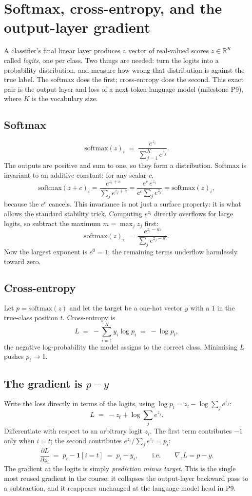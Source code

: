 \section{Softmax, cross-entropy, and the output-layer gradient}\label{sec:03}

A classifier's final linear layer produces a vector of real-valued scores
$z \in \mathbb{R}^{K}$ called \emph{logits}, one per class. Two things are
needed: turn the logits into a probability distribution, and measure how wrong
that distribution is against the true label. The softmax does the first;
cross-entropy does the second. This exact pair is the output layer and loss of a
next-token language model (milestone P9), where $K$ is the vocabulary size.

\subsection*{Softmax}
\[
  \mathrm{softmax}(z)_i \;=\; \frac{e^{z_i}}{\sum_{j=1}^{K} e^{z_j}}.
\]
The outputs are positive and sum to one, so they form a distribution. Softmax is
invariant to an additive constant: for any scalar $c$,
\[
  \mathrm{softmax}(z+c)_i
    = \frac{e^{z_i+c}}{\sum_j e^{z_j+c}}
    = \frac{e^{c}\,e^{z_i}}{e^{c}\sum_j e^{z_j}}
    = \mathrm{softmax}(z)_i,
\]
because the $e^{c}$ cancels. This invariance is not just a surface property: it is what
allows the standard stability trick. Computing $e^{z_i}$ directly overflows for large
logits, so subtract the maximum $m=\max_j z_j$ first:
\[
  \mathrm{softmax}(z)_i \;=\; \frac{e^{z_i - m}}{\sum_{j} e^{z_j - m}}.
\]
Now the largest exponent is $e^{0}=1$; the remaining terms underflow harmlessly
toward zero.

\subsection*{Cross-entropy}
Let $p=\mathrm{softmax}(z)$ and let the target be a one-hot vector $y$ with a $1$
in the true-class position $t$. Cross-entropy is
\[
  L \;=\; -\sum_{i=1}^{K} y_i \log p_i \;=\; -\log p_t,
\]
the negative log-probability the model assigns to the correct class. Minimising
$L$ pushes $p_t \to 1$.

\subsection*{The gradient is $p-y$}
Write the loss directly in terms of the logits, using
$\log p_t = z_t - \log\sum_j e^{z_j}$:
\[
  L \;=\; -z_t + \log\sum_{j} e^{z_j}.
\]
Differentiate with respect to an arbitrary logit $z_i$. The first term
contributes $-1$ only when $i=t$; the second contributes
$e^{z_i}/\sum_j e^{z_j}=p_i$:
\[
  \frac{\partial L}{\partial z_i}
    \;=\; p_i - \mathbf{1}[i=t]
    \;=\; p_i - y_i,
  \qquad\text{i.e.}\qquad
  \nabla_z L = p - y.
\]
The gradient at the logits is simply \emph{prediction minus target}. This is the
single most reused gradient in the course: it collapses the output-layer
backward pass to a subtraction, and it reappears unchanged at the language-model
head in P9.

